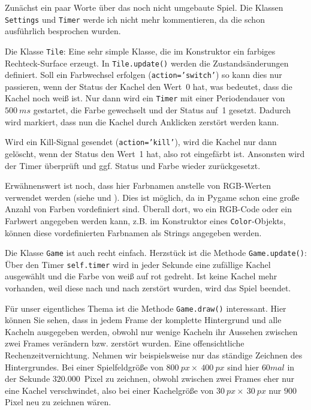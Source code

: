 Zunächst ein paar Worte über das noch nicht umgebaute Spiel. Die Klassen \texttt{Settings} und \texttt{Timer} werde ich nicht mehr kommentieren, da die schon ausführlich besprochen wurden. 

Die Klasse \texttt{Tile}: Eine sehr simple Klasse, die im Konstruktor ein farbiges Rechteck-Surface erzeugt. In \texttt{Tile.update()} werden die Zustandsänderungen definiert. Soll ein Farbwechsel erfolgen (\texttt{action='switch'}) so kann dies nur passieren, wenn der Status der Kachel den Wert~0 hat, was bedeutet, dass die Kachel noch weiß ist. Nur dann wird ein \texttt{Timer} mit einer Periodendauer von $500~ms$ gestartet, die Farbe gewechselt und der Status auf~1 gesetzt. Dadurch wird markiert, dass nun die Kachel durch Anklicken zerstört werden kann.

Wird ein Kill-Signal gesendet (\texttt{action='kill'}), wird die Kachel nur dann gelöscht, wenn der Status den Wert~1 hat, also rot eingefärbt ist. Ansonsten wird der Timer überprüft und ggf. Status und Farbe wieder zurückgesetzt.

Erwähnenswert ist noch, dass hier Farbnamen anstelle von RGB-Werten verwendet werden (siehe  und ). Dies ist möglich, da in Pygame schon eine große Anzahl von Farben vordefiniert sind. Überall dort, wo ein RGB-Code oder ein Farbwert angegeben werden kann, z.B. im Konstruktor eines \texttt{Color}-Objekts, können diese vordefinierten Farbnamen als Strings angegeben werden.


Die Klasse \texttt{Game} ist auch recht einfach. Herzstück ist die Methode \texttt{Game.update()}: Über den Timer \texttt{self.timer} wird in jeder Sekunde eine zufällige Kachel ausgewählt und die Farbe von weiß auf rot gedreht. Ist keine Kachel mehr vorhanden, weil diese nach und nach zerstört wurden, wird das Spiel beendet.

Für unser eigentliches Thema ist die Methode \texttt{Game.draw()} interessant. Hier können Sie sehen, dass in jedem Frame der komplette Hintergrund und alle Kacheln ausgegeben werden, obwohl nur wenige Kacheln ihr Aussehen zwischen zwei Frames verändern bzw. zerstört wurden. Eine offensichtliche Rechenzeitvernichtung. Nehmen wir beispielsweise nur das ständige Zeichnen des Hintergrundes. Bei einer Spielfeldgröße von $800~px\times~400~px$ sind hier $60mal$ in der Sekunde $320.000$~Pixel zu zeichnen, obwohl zwischen zwei Frames eher nur eine Kachel verschwindet, also bei einer Kachelgröße von $30~px\times~30~px$ nur $900$ Pixel neu zu zeichnen wären.

